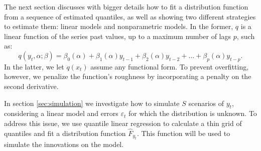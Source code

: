 The next section discusses with bigger details how to fit a distribution function from a sequence of estimated quantiles, as well as showing two different strategies to estimate them: linear models and nonparametric models. In the former, $q$ is a linear function of the series past values, up to a maximum number of lags $p$, such as:
\begin{equation}
q(y_t, \alpha; \beta) = \beta_0(\alpha) + \beta_1(\alpha)y_{t-1} + \beta_2(\alpha)y_{t-2} + \dots + \beta_p(\alpha) y_{t-p}.
\label{eq:ft-qar}
\end{equation}
In the latter, we let $q(x_t)$ assume any functional form. To prevent overfitting, however, we penalize the function's roughness by incorporating a penalty on the second derivative.

In section \ref{sec:simulation} we investigate how to simulate $S$ scenarios of $y_t$, considering a linear model and errors $\varepsilon_t$ for which the distribution is unknown. To address this issue, we use quantile linear regression to calculate a thin grid of quantiles and fit a distribution function $\hat{F}_{y_t}$. This function will be used to simulate the innovations on the model.


